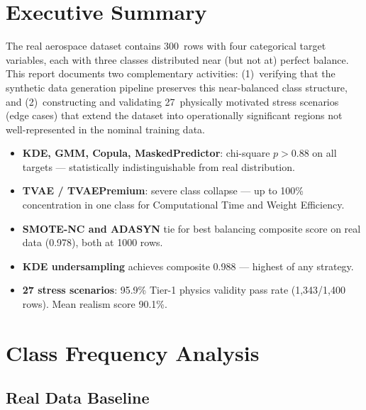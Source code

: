\documentclass[12pt,a4paper]{article}
\begin{document}
\tableofcontents
\newpage

\section{Executive Summary}

The real aerospace dataset contains 300~rows with four categorical target variables, each with three classes distributed near (but not at) perfect balance. This report documents two complementary activities: (1)~verifying that the synthetic data generation pipeline preserves this near-balanced class structure, and (2)~constructing and validating 27~physically motivated stress scenarios (edge cases) that extend the dataset into operationally significant regions not well-represented in the nominal training data.

\begin{tcolorbox}[successbox, title={Key Results at a Glance}]
\begin{itemize}[noitemsep]
  \item \textbf{KDE, GMM, Copula, MaskedPredictor}: chi-square $p > 0.88$ on all targets --- statistically indistinguishable from real distribution.
  \item \textbf{TVAE / TVAEPremium}: severe class collapse --- up to 100\% concentration in one class for Computational Time and Weight Efficiency.
  \item \textbf{SMOTE-NC and ADASYN} tie for best balancing composite score on real data (0.978), both at 1000 rows.
  \item \textbf{KDE undersampling} achieves composite 0.988 --- highest of any strategy.
  \item \textbf{27 stress scenarios}: 95.9\% Tier-1 physics validity pass rate (1,343/1,400 rows). Mean realism score 90.1\%.
\end{itemize}
\end{tcolorbox}

\section{Class Frequency Analysis}

\subsection{Real Data Baseline}
\end{document}
